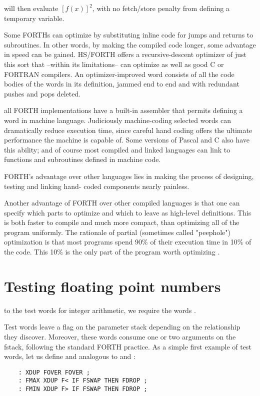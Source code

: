will then evaluate $[f(x)]^2$, with no fetch/store penalty from defining
a temporary variable.

Some FORTHs can optimize by substituting inline code for jumps
and returns to subroutines. In other words, by making the compiled code longer,
some advantage in speed can be gained.
HS/FORTH offers a recursive-descent optimizer of just this sort
that --within its limitations-- can optimize as well as good C or
FORTRAN compilers. An optimizer-improved word consists of
all the code bodies of the words in its definition, jammed end to
end and with redundant pushes and pops deleted.

 all FORTH implementations have a built-in assembler
that permits defining a word in machine language. Judiciously
machine-coding selected words can dramatically reduce execution time, since
careful hand coding offers the ultimate performance the machine is capable of.
Some versions of Pascal and C
also have this ability; and of course most compiled and linked
languages can link to functions and subroutines defined in
machine code.

FORTH's advantage over other languages lies in making the 
process of designing, testing and linking hand- coded components
nearly painless.

Another advantage of FORTH over other compiled languages is
that one can specify which parts to optimize and which to leave
as high-level definitions. This is both faster to compile and much
more compact, than optimizing all of the program uniformly. The
rationale of partial (sometimes called "peephole") optimization
is that most programs spend 90\% of their execution time in 10\%
of the code. This 10\% is the only part of the program worth
optimizing  .

\section{Testing floating point numbers}

 to the test words for integer arithmetic, we require
the words .

Test words leave a flag on the parameter stack depending on the
relationship they discover. Moreover, these words consume one
or two arguments on the fstack, following the standard FORTH
practice. As a simple first example of test words, let us define
 and  analogous to  and :
\begin{lstlisting}
    : XDUP FOVER FOVER ;
    : FMAX XDUP F< IF FSWAP THEN FDROP ;
    : FMIN XDUP F> IF FSWAP THEN FDROP ;
\end{lstlisting}


